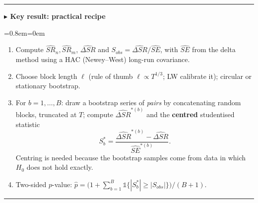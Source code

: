 \documentclass[11pt,a4paper]{report}
\newenvironment{notebox}[1]
  {\par\medskip\Needspace{6\baselineskip}\noindent\rule{\linewidth}{0.4pt}\par\nopagebreak
   \noindent\textbf{#1}\par\nopagebreak
   \begin{list}{}{\leftmargin=0.8em\rightmargin=0em\topsep=2pt}\item[]}
  {\end{list}\nopagebreak\noindent\rule{\linewidth}{0.4pt}\par\medskip}
\newenvironment{keybox}[1][]{\begin{notebox}{$\blacktriangleright$ Key result#1}}{\end{notebox}}
\begin{document}
\begin{keybox}[: practical recipe]
\begin{enumerate}
  \item Compute $\widehat{SR}_n,\widehat{SR}_m$, $\widehat{\Delta SR}$ and
    $S_{obs}=\widehat{\Delta SR}/\widehat{SE}$, with $\widehat{SE}$ from the
    delta method using a HAC (Newey--West) long-run covariance.
  \item Choose block length $\ell$ (rule of thumb $\ell\propto T^{1/3}$; LW
    calibrate it); circular or stationary bootstrap.
  \item For $b=1,\dots,B$: draw a bootstrap series of \emph{pairs} by
    concatenating random blocks, truncated at $T$; compute
    $\widehat{\Delta SR}^{*(b)}$ and the \textbf{centred} studentised statistic
    \[ S_b^*=\frac{\widehat{\Delta SR}^{*(b)}-\widehat{\Delta SR}}{\widehat{SE}^{*(b)}} . \]
    Centring is needed because the bootstrap samples come from data in which
    $H_0$ does not hold exactly.
  \item Two-sided $p$-value:
    $\hat p=\Big(1+\sum_{b=1}^B\mathbb 1\{|S_b^*|\ge|S_{obs}|\}\Big)\big/(B+1)$.
\end{enumerate}
\end{keybox}
\end{document}
